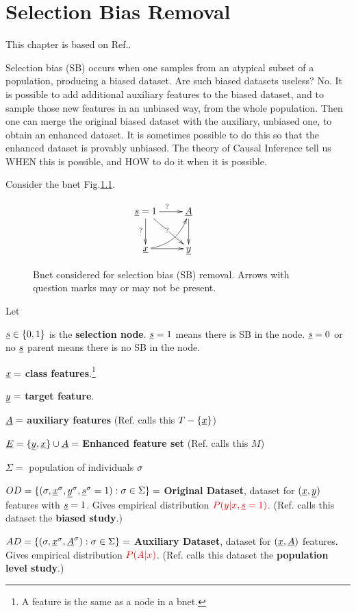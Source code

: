 \chapter{Selection Bias Removal}
This chapter 
is based on Ref.\cite{bare-sb-removal}.

Selection bias (SB)
occurs when one 
samples from an
atypical subset
of a
population,
producing a biased dataset.
Are such biased 
datasets
useless? No. 
It is possible to 
add additional auxiliary features
to the biased dataset, and to 
sample those new features
in an unbiased way,
 from the whole population.
Then
one can merge
the original
 biased dataset with the
auxiliary, unbiased one,
to obtain an enhanced dataset.
It is sometimes
possible to do this so that the enhanced
dataset is provably 
unbiased.
The theory of Causal
Inference tell us 
WHEN this is possible,
and HOW to do it
when it is possible.

Consider the bnet 
Fig.\ref{fig-bs-removal-basic}.

\begin{figure}[h!]
$$
\xymatrix{
\rvs=1\ar[dr]|?\ar[d]_?\ar[r]^?
&\rvA\ar[d]
&
\\
\rvx\ar[r]\ar@/_.9pc/[ru]
&\rvy
}
$$
\caption{Bnet considered for 
selection bias (SB) removal.
Arrows with question marks
may or may not be present.}
\label{fig-bs-removal-basic}
\end{figure}

Let

${\underline{s}}\in\{0,1\}$
is the {\bf selection node}.
${\underline{s}}=1$ means there is 
SB
in the node.
${\underline{s}}=0$ or no ${\underline{s}}$ parent
means there 
is no SB in the node.


${\underline{x}}=$ {\bf class features}.\footnote{
A feature is the same as a node in a bnet.}

${\underline{y}}=$ {\bf target feature}.

${\underline{A}}=$ {\bf auxiliary features}
(Ref.\cite{bare-sb-removal} 
calls this $T-\{{\underline{x}}\}$) 

${\underline{E}}=\{{\underline{y}}, {\underline{x}}\}\cup{\underline{A}}=$ 
{\bf Enhanced feature set}
(Ref.\cite{bare-sb-removal} calls this $M$) 

$\Sigma=$ population of individuals $\sigma$

$OD=\{(\sigma,{\underline{x}}^\sigma,  {\underline{y}}^\sigma,{\underline{s}}^\sigma=1):\sigma\in\Sigma\}=$ 
{\bf Original Dataset}, dataset for $({\underline{x}},{\underline{y}})$ features
with ${\underline{s}}=1$. 
Gives empirical
distribution $\color{red}{P(y|x, {\underline{s}}=1)}$.
(Ref.\cite{bare-sb-removal} 
calls this dataset the {\bf biased study}.)

$AD=\{(\sigma, {\underline{x}}^\sigma,{\underline{A}}^\sigma):\sigma\in\Sigma\}=$ 
{\bf Auxiliary Dataset}, dataset for $({\underline{x}}, {\underline{A}})$ features.
Gives empirical
distribution $\color{red}{P(A|x)}$.
(Ref.\cite{bare-sb-removal} 
calls this dataset the 
{\bf population level study}.)


